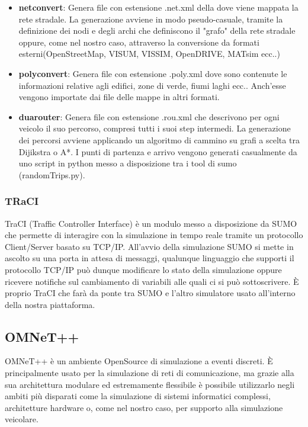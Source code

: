 \begin{itemize}
 	\item \textbf{netconvert}: Genera file con estensione .net.xml della dove viene mappata la rete stradale. La generazione avviene in modo pseudo-casuale, tramite la definizione dei nodi e degli archi che definiscono il "grafo" della rete stradale oppure, come nel nostro caso, attraverso la conversione da formati esterni(OpenStreetMap, VISUM, VISSIM, OpenDRIVE, MATsim ecc..)
 	\item \textbf{polyconvert}: Genera file con estensione .poly.xml dove sono contenute le informazioni relative agli edifici, zone di verde, fiumi laghi ecc.. Anch'esse vengono importate dai file delle mappe in altri formati.
 	 \item \textbf{duarouter}: Genera file con estensione .rou.xml che descrivono per ogni veicolo il suo percorso, compresi tutti i suoi step intermedi. La generazione dei percorsi avviene applicando un algoritmo di cammino su grafi a scelta tra Dijikstra o A*. I punti di partenza e arrivo vengono generati casualmente da uno script in python messo a disposizione tra i tool di sumo (randomTrips.py).
\end{itemize}

\subsubsection{TRaCI}

TraCI (Traffic Controller Interface) è un modulo messo a disposizione da SUMO che permette di interagire con la simulazione in tempo reale tramite un protocollo Client/Server basato su TCP/IP. All'avvio della simulazione SUMO si mette in ascolto su una porta in attesa di messaggi, qualunque linguaggio che supporti il protocollo TCP/IP può dunque modificare lo stato della simulazione oppure ricevere notifiche sul cambiamento di variabili alle quali ci si può sottoscrivere. È proprio TraCI che farà da ponte tra SUMO e l'altro simulatore usato all'interno della nostra piattaforma.


\subsection{OMNeT++}
OMNeT++ è un ambiente OpenSource di simulazione a eventi discreti. È principalmente usato per la simulazione di reti di comunicazione, ma grazie alla sua architettura modulare ed estremamente flessibile è possibile utilizzarlo negli ambiti più disparati come la simulazione di sistemi informatici complessi, architetture hardware o, come nel nostro caso, per supporto alla simulazione veicolare.


